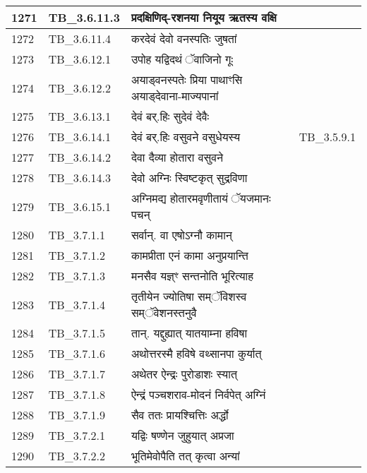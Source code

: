 \documentclass[17pt]{extarticle}
\begin{document}
\begin{longtable}{||p{0.4in}||p{0.9in}||p{4.0in}||p{0.9in}||}
        \hline
            1271 & TB\_3.6.11.3 & प्रदक्षिणिद्{-}रशनया नियूय ऋतस्य वक्षि &      \\
        \hline
            1272 & TB\_3.6.11.4 & करदेवं देवो वनस्पतिः जुषतां &      \\
        \hline
            1273 & TB\_3.6.12.1 & उपोह यद्विदथं ॅवाजिनो गूः &      \\
        \hline
            1274 & TB\_3.6.12.2 & अयाड्वनस्पतेः प्रिया पाथाꣳसि अयाड्देवाना{-}माज्यपानां &      \\
        \hline
            1275 & TB\_3.6.13.1 & देवं बर्.हिः सुदेवं देवैः &      \\
        \hline
            1276 & TB\_3.6.14.1 & देवं बर्.हिः वसुवने वसुधेयस्य & TB\_3.5.9.1        \\
        \hline
            1277 & TB\_3.6.14.2 & देवा दैव्या होतारा वसुवने &      \\
        \hline
            1278 & TB\_3.6.14.3 & देवो अग्निः स्विष्टकृत् सुद्रविणा &      \\
        \hline
            1279 & TB\_3.6.15.1 & अग्निमद्य होतारमवृणीतायं ॅयजमानः पचन् &      \\
        \hline
            1280 & TB\_3.7.1.1 & सर्वान्. वा एषोऽग्नौ कामान् &      \\
        \hline
            1281 & TB\_3.7.1.2 & कामप्रीता एनं कामा अनुप्रयान्ति &      \\
        \hline
            1282 & TB\_3.7.1.3 & मनसैव यज्ञ्ꣳ सन्तनोति भूरित्याह &      \\
        \hline
            1283 & TB\_3.7.1.4 & तृतीयेन ज्योतिषा सम्ॅविशस्व सम्ॅवेशनस्तनुवै &      \\
        \hline
            1284 & TB\_3.7.1.5 & तान्. यद्दुह्यात् यातयाम्ना हविषा &      \\
        \hline
            1285 & TB\_3.7.1.6 & अथोत्तरस्मै हविषे वथ्सानपा कुर्यात् &      \\
        \hline
            1286 & TB\_3.7.1.7 & अथेतर ऐन्द्रः पुरोडाशः स्यात् &      \\
        \hline
            1287 & TB\_3.7.1.8 & ऐन्द्रं पञ्चशराव{-}मोदनं निर्वपेत् अग्निं &      \\
        \hline
            1288 & TB\_3.7.1.9 & सैव ततः प्रायश्चित्तिः अर्द्धो &      \\
        \hline
            1289 & TB\_3.7.2.1 & यद्विः षण्णेन जुहुयात् अप्रजा &      \\
        \hline
            1290 & TB\_3.7.2.2 & भूतिमेवोपैति तत् कृत्वा अन्यां &      \\

\end{longtable}
\end{document}
